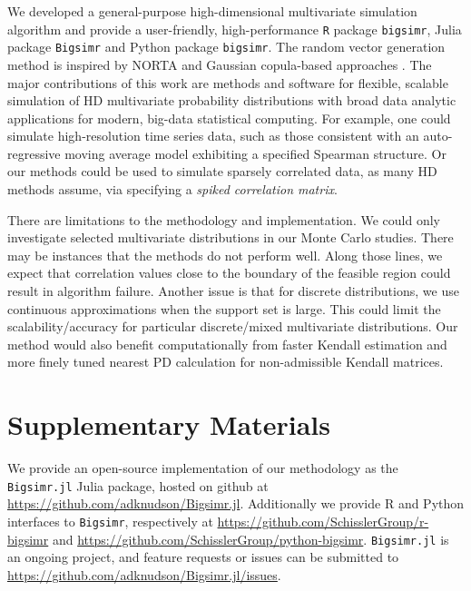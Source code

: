 \documentclass[
]{jss}
\begin{document}
We developed a general-purpose high-dimensional multivariate simulation
algorithm and provide a user-friendly, high-performance \texttt{R}
package \texttt{bigsimr}, Julia package \texttt{Bigsimr} and Python
package \texttt{bigsimr}. The random vector generation method is
inspired by NORTA \citep{Cario1997} and Gaussian copula-based approaches
\citep[\citet{BF17}, \citet{Xia17}]{MB13}. The major contributions of
this work are methods and software for flexible, scalable simulation of
HD multivariate probability distributions with broad data analytic
applications for modern, big-data statistical computing. For example,
one could simulate high-resolution time series data, such as those
consistent with an auto-regressive moving average model exhibiting a
specified Spearman structure. Or our methods could be used to simulate
sparsely correlated data, as many HD methods assume, via specifying a
\emph{spiked correlation matrix}.

There are limitations to the methodology and implementation. We could
only investigate selected multivariate distributions in our Monte Carlo
studies. There may be instances that the methods do not perform well.
Along those lines, we expect that correlation values close to the
boundary of the feasible region could result in algorithm failure.
Another issue is that for discrete distributions, we use continuous
approximations when the support set is large. This could limit the
scalability/accuracy for particular discrete/mixed multivariate
distributions. Our method would also benefit computationally from faster
Kendall estimation and more finely tuned nearest PD calculation for
non-admissible Kendall matrices.

\newpage

\hypertarget{misc}{%
\section*{Supplementary Materials}\label{misc}}

We provide an open-source implementation of our methodology as the
\texttt{Bigsimr.jl} Julia package, hosted on github at
\url{https://github.com/adknudson/Bigsimr.jl}. Additionally we provide R
and Python interfaces to \texttt{Bigsimr}, respectively at
\url{https://github.com/SchisslerGroup/r-bigsimr} and
\url{https://github.com/SchisslerGroup/python-bigsimr}.
\texttt{Bigsimr.jl} is an ongoing project, and feature requests or
issues can be submitted to
\url{https://github.com/adknudson/Bigsimr.jl/issues}.
\end{document}
